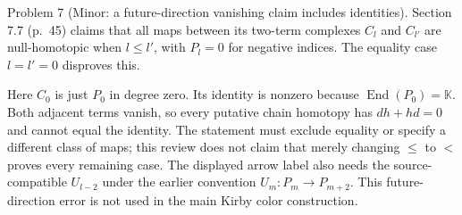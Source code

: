 \documentclass[10pt]{article}
\begin{document}
Problem 7 (Minor: a future-direction vanishing claim includes identities).  Section 7.7 (p. 45) claims that all maps between its two-term complexes \(C_l\) and \(C_{l'}\) are null-homotopic when \(l\leq l'\), with \(P_l=0\) for negative indices. The equality case \(l=l'=0\) disproves this.\par
Here \(C_0\) is just \(P_0\) in degree zero. Its identity is nonzero because \(\operatorname{End}(P_0)=\mathbb K\). Both adjacent terms vanish, so every putative chain homotopy has \(dh+hd=0\) and cannot equal the identity. The statement must exclude equality or specify a different class of maps; this review does not claim that merely changing \(\leq\) to \(<\) proves every remaining case. The displayed arrow label also needs the source-compatible \(U_{l-2}\) under the earlier convention \(U_m:P_m\to P_{m+2}\). This future-direction error is not used in the main Kirby color construction.\par
\end{document}
